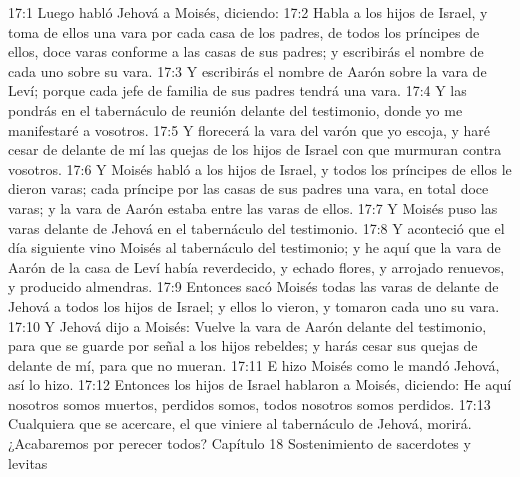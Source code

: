 17:1 Luego habló Jehová a Moisés, diciendo:  
17:2 Habla a los hijos de Israel, y toma de ellos una vara por cada casa de los padres, de todos los príncipes de ellos, doce varas conforme a las casas de sus padres; y escribirás el nombre de cada uno sobre su vara.  
17:3 Y escribirás el nombre de Aarón sobre la vara de Leví; porque cada jefe de familia de sus padres tendrá una vara.  
17:4 Y las pondrás en el tabernáculo de reunión delante del testimonio, donde yo me manifestaré a vosotros.  
17:5 Y florecerá la vara del varón que yo escoja, y haré cesar de delante de mí las quejas de los hijos de Israel con que murmuran contra vosotros.  
17:6 Y Moisés habló a los hijos de Israel, y todos los príncipes de ellos le dieron varas; cada príncipe por las casas de sus padres una vara, en total doce varas; y la vara de Aarón estaba entre las varas de ellos.  
17:7 Y Moisés puso las varas delante de Jehová en el tabernáculo del testimonio.  
17:8 Y aconteció que el día siguiente vino Moisés al tabernáculo del testimonio; y he aquí que la vara de Aarón de la casa de Leví había reverdecido, y echado flores, y arrojado renuevos, y producido almendras. 
17:9 Entonces sacó Moisés todas las varas de delante de Jehová a todos los hijos de Israel; y ellos lo vieron, y tomaron cada uno su vara.  
17:10 Y Jehová dijo a Moisés: Vuelve la vara de Aarón delante del testimonio, para que se guarde por señal a los hijos rebeldes; y harás cesar sus quejas de delante de mí, para que no mueran.  
17:11 E hizo Moisés como le mandó Jehová, así lo hizo.  
17:12 Entonces los hijos de Israel hablaron a Moisés, diciendo: He aquí nosotros somos muertos, perdidos somos, todos nosotros somos perdidos.  
17:13 Cualquiera que se acercare, el que viniere al tabernáculo de Jehová, morirá. ¿Acabaremos por perecer todos?  
Capítulo 18 
Sostenimiento de sacerdotes y levitas  

